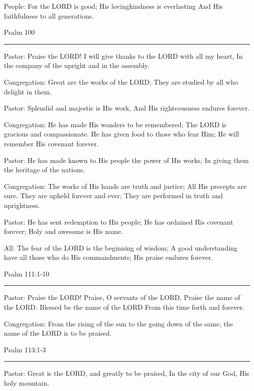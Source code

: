 \documentclass[]{book}
\begin{document}
People: For the LORD is good; His lovingkindness is everlasting And His faithfulness to all generations.

Psalm 100 \textbar{}

\begin{center}\rule{0.5\linewidth}{\linethickness}\end{center}

Pastor: Praise the LORD! I will give thanks to the LORD with all my heart, In the company of the upright and in the assembly.

Congregation: Great are the works of the LORD; They are studied by all who delight in them.

Pastor: Splendid and majestic is His work, And His righteousness endures forever.

Congregation: He has made His wonders to be remembered; The LORD is gracious and compassionate. He has given food to those who fear Him; He will remember His covenant forever.

Pastor: He has made known to His people the power of His works, In giving them the heritage of the nations.

Congregation: The works of His hands are truth and justice; All His precepts are sure. They are upheld forever and ever; They are performed in truth and uprightness.

Pastor: He has sent redemption to His people; He has ordained His covenant forever; Holy and awesome is His name.

All: The fear of the LORD is the beginning of wisdom; A good understanding have all those who do His commandments; His praise endures forever.

Psalm 111:1-10 \textbar{}

\begin{center}\rule{0.5\linewidth}{\linethickness}\end{center}

Pastor: Praise the LORD! Praise, O servants of the LORD, Praise the name of the LORD. Blessed be the name of the LORD From this time forth and forever.

Congregation: From the rising of the sun to the going down of the same, the name of the LORD is to be praised.

Psalm 113:1-3 \textbar{}

\begin{center}\rule{0.5\linewidth}{\linethickness}\end{center}

Pastor: Great is the LORD, and greatly to be praised, In the city of our God, His holy mountain.
\end{document}
